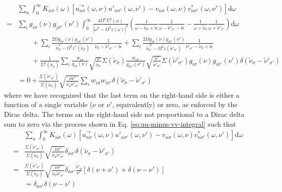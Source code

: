 \begin{equation}
\begin{split}
&\sum_n\int_0^\infty K_{n\sigma}(\omega)\left[u_{n\sigma}^{\prime*}(\omega,\nu)u'_{n\sigma'}(\omega,\nu') - v_{n\sigma}(\omega,\nu)v_{n\sigma'}^*(\omega,\nu')\right]\mathrm{d}\omega\\
= &\sum_ig_{i\sigma}(\nu)g_{j\sigma'}(\nu')\int_0^\infty\frac{4\Omega^2\Sigma^2(\omega)}{|\omega^2 - \Omega^2z(\omega)|^2}\left(\frac{1}{\omega - \tilde{\nu}_\sigma + \mathrm{i}\epsilon}\frac{1}{\omega - \tilde{\nu}'_{\sigma'} - \mathrm{i}\epsilon} - \frac{1}{\omega + \tilde{\nu}_\sigma}\frac{1}{\omega + \tilde{\nu}'_{\sigma'}}\right)\mathrm{d}\omega\\
&\qquad + \sum_i\frac{2\Omega g_{i\sigma}(\nu)g_{i\sigma'}(\nu')}{\tilde{\nu}_\sigma^2 - \Omega^2z^*(\tilde{\nu}_\sigma)}\frac{1}{\tilde{\nu}_\sigma - \tilde{\nu}'_{\sigma'} - \mathrm{i}\epsilon} + \sum_i\frac{2\Omega g_{i\sigma}(\nu)g_{i\sigma'}(\nu')}{\tilde{\nu}^{\prime2}_{\sigma'} - \Omega^2z(\tilde{\nu}'_{\sigma'})}\frac{1}{\tilde{\nu}'_{\sigma'} - \tilde{\nu}_\sigma + \mathrm{i}\epsilon}\\
&\qquad + \frac{1}{\Sigma^2(\tilde{\nu}_\sigma)}\sum_i\frac{w_{i\sigma}}{g_{i\sigma}(\nu)}\sqrt{\frac{\nu}{\tilde{\nu}_\sigma}}\Sigma(\tilde{\nu}_\sigma)\frac{w_{i\sigma'}}{g_{i\sigma'}(\nu')}\sqrt{\frac{\nu'}{\tilde{\nu}'_{\sigma'}}}\Sigma(\tilde{\nu}'_{\sigma'})g_{i\sigma}(\nu)g_{i\sigma'}(\nu')\delta(\tilde{\nu}_\sigma - \tilde{\nu}'_{\sigma'})\\
&= 0 + \frac{\Sigma(\tilde{\nu}'_{\sigma'})}{\Sigma(\tilde{\nu}_\sigma)}\sqrt{\frac{\nu\nu'}{\tilde{\nu}_\sigma\tilde{\nu}'_{\sigma'}}}\sum_iw_{i\sigma}w_{i\sigma'}\delta(\tilde{\nu}_\sigma - \tilde{\nu}'_{\sigma'})
\end{split}
\end{equation}
where we have recognized that the last term on the right-hand side is either a function of a single variable ($\nu$ or $\nu'$, equivalently) or zero, as enforced by the Dirac delta. The terms on the right-hand side not proportional to a Dirac delta sum to zero via the process shown in Eq. \eqref{eq:uu-minus-vv-integral} such that
\begin{equation}
\begin{split}
&\sum_n\int_0^\infty K_{n\sigma}(\omega)\left[u_{n\sigma}^{\prime*}(\omega,\nu)u'_{n\sigma'}(\omega,\nu') - v_{n\sigma}(\omega,\nu)v_{n\sigma'}^*(\omega,\nu')\right]\mathrm{d}\omega\\
= & \frac{\Sigma(\tilde{\nu}'_{\sigma'})}{\Sigma(\tilde{\nu}_\sigma)}\sqrt{\frac{\nu\nu'}{\tilde{\nu}_\sigma\tilde{\nu}'_{\sigma'}}}\delta_{\sigma\sigma'}\delta(\tilde{\nu}_\sigma - \tilde{\nu}'_{\sigma'})\\
= & \frac{\Sigma(\tilde{\nu}'_{\sigma'})}{\Sigma(\tilde{\nu}_\sigma)}\sqrt{\frac{\nu\nu'}{\tilde{\nu}_\sigma\tilde{\nu}'_{\sigma'}}}\delta_{\sigma\sigma'}\frac{\tilde{\nu}'_\sigma}{\nu'}\left[\delta(\nu + \nu') + \delta(\nu - \nu')\right]\\
&= \delta_{\sigma\sigma'}\delta(\nu - \nu')
\end{split}
\end{equation}
